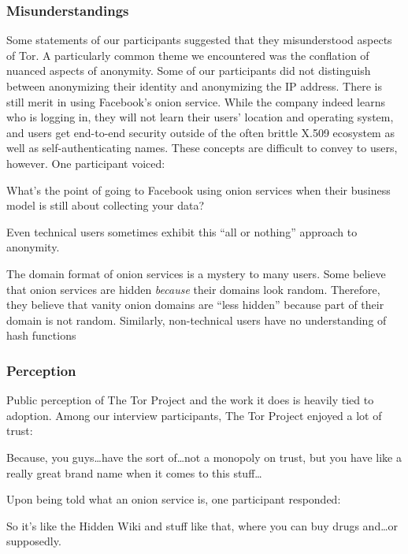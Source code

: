 \subsubsection{Misunderstandings}

Some statements of our participants suggested that they misunderstood aspects of
Tor.  A particularly common theme we encountered was the conflation of nuanced
aspects of anonymity.  Some of our participants did not distinguish between
anonymizing their identity and anonymizing the IP address.  There is still merit
in using Facebook's onion service.  While the company indeed learns who is
logging in, they will not learn their users' location and operating system, and
users get end-to-end security outside of the often brittle X.509 ecosystem as
well as self-authenticating names.  These concepts are difficult to convey to
users, however.  One participant voiced:

\begin{displayquote}
What's the point of going to Facebook using onion services when their business
model is still about collecting your data?
\end{displayquote}
Even technical users sometimes exhibit this ``all or nothing'' approach to
anonymity.

The domain format of onion services is a mystery to many users.  Some believe
that onion services are hidden \emph{because} their domains look random.
Therefore, they believe that vanity onion domains are ``less hidden'' because
part of their domain is not random.  Similarly, non-technical users have no
understanding of hash functions 

\subsubsection{Perception}

Public perception of The Tor Project and the work it does is heavily tied to
adoption.  Among our interview participants, The Tor Project enjoyed a lot
of trust:

\begin{displayquote}
Because, you guys\dots have the sort of\dots not a monopoly on trust, but you
have like a really great brand name when it comes to this stuff\dots
\end{displayquote}

Upon being told what an onion service is, one participant responded:

\begin{displayquote}
So it's like the Hidden Wiki and stuff like that, where you can buy drugs
and\dots or supposedly.
\end{displayquote}

